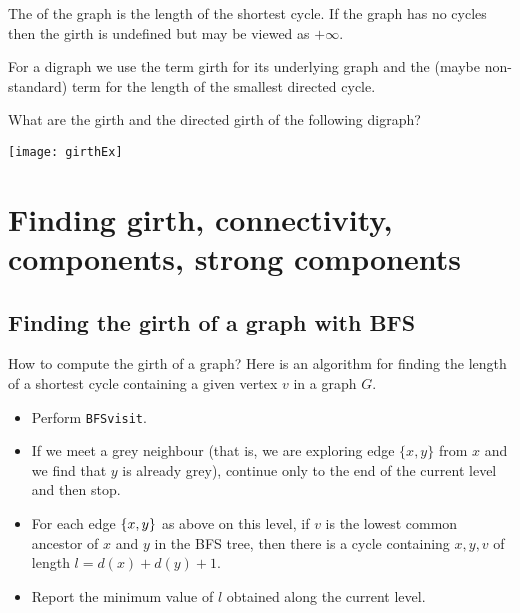 \begin{Definition}
The  of the graph is the length of the shortest cycle. If the graph has no cycles then the
girth is undefined but may be viewed as $+\infty$. 

For a digraph we use the term girth for its underlying graph and the (maybe non-standard) term  for
the length of the smallest directed cycle.
\end{Definition}

\begin{Boxample}[0]
What are the girth and the directed girth of the following digraph?
\begin{center}
\texttt{[image: girthEx]}
\end{center}
\end{Boxample}




\chapter{Finding girth, connectivity, components, strong components} %

\section{Finding the girth of a graph with BFS}
How to compute the girth of a graph? Here is an algorithm for finding
the length of a shortest cycle containing a given vertex $v$ in a graph $G$. 
\begin{itemize}
  \item Perform \texttt{BFSvisit}. 
  \item If we meet a grey neighbour 
  (that is, we are exploring edge $\{x, y\}$ from $x$ and we find that $y$ is already grey), 
  continue only to the end of the current level and then stop.
  \item For each edge $\mbox{$\{x, y\}$}$ as above on this level, 
  if $v$ is the lowest common ancestor of $x$ and $y$ in the BFS tree, then there is a cycle
  containing $x, y, v$ of length $l=d(x) + d(y) + 1$. 
  \item Report the minimum value of $l$ obtained along the current level.
\end{itemize}

